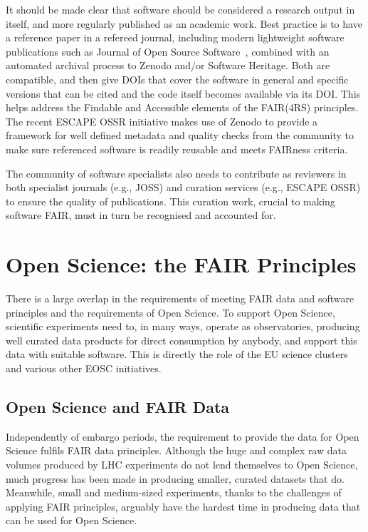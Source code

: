 It should be made clear that software should be considered a research output in itself, and more regularly published as an academic work. Best practice is to have a reference paper in a refereed journal, including modern lightweight software publications such as Journal of Open Source Software~\cite{JOSS}, combined with an automated archival process to Zenodo and/or Software Heritage. Both are compatible, and then give DOIs that cover the software in general and specific versions that can be cited and the code itself becomes available via its DOI. This helps address the Findable and Accessible elements of the FAIR(4RS) principles. The recent ESCAPE OSSR initiative makes use of Zenodo to provide a framework for well defined metadata and quality checks from the community to make sure referenced software is readily reusable and meets FAIRness criteria.

The community of software specialists also needs to contribute as reviewers in both specialist journals (e.g., JOSS) and curation services (e.g., ESCAPE OSSR) to ensure the quality of publications.  This curation work, crucial to making software FAIR, must in turn be recognised and accounted for.


\section{Open Science: the FAIR Principles}

There is a large overlap in the requirements of meeting FAIR data and software principles
and the requirements of Open Science. To support Open Science, scientific experiments need to, in many ways, operate as observatories, producing well curated data products for direct consumption by anybody, and support this data with suitable software. This is directly the role of the EU science clusters and various other EOSC initiatives.


\subsection{Open Science and FAIR Data}

Independently of embargo periods, the requirement to provide the data for Open Science fulfils FAIR data principles.  Although the huge and complex raw data volumes produced by LHC experiments do not lend themselves to Open Science, much progress has been made in producing smaller, curated datasets that do.  Meanwhile, small and medium-sized experiments, thanks to the challenges of applying FAIR principles, arguably have the hardest time in producing data that can be used for Open Science.

